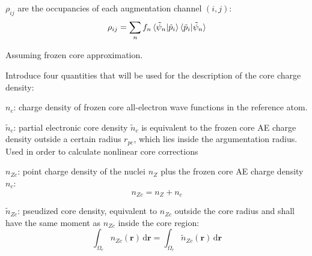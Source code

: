 \documentclass[english,10pt,aspectratio=169,fleqn]{beamer}
\begin{document}
\begin{frame} %

$\rho_{ij}$ are the  occupancies of each augmentation channel $(i,j)$:
\begin{equation*}
\rho_{ij} = \sum_{n} f_{n} \braket{\tilde{\psi}_{n} | \tilde{p}_{i} }
\braket{\tilde{p}_{i} | \tilde{\psi}_{n} }
\end{equation*}

\end{frame}



\begin{frame}

Assuming frozen core approximation.

Introduce four quantities that will be used for the description of the core
charge density:

$n_{c}$: charge density of frozen core all-electron wave functions
in the reference atom.

$\tilde{n}_{c}$: partial electronic core density $\tilde{n}_{c}$ is equivalent
to the frozen core AE charge density outside a certain radius $r_{pc}$, which lies
inside the argumentation radius. Used in order to calculate nonlinear core
corrections

$n_{Zc}$: point charge density of the nuclei $n_{Z}$ plus the frozen core AE charge
density $n_{c}$:
\begin{equation*}
n_{Zc} = n_{Z} + n_{c}
\end{equation*}

$\tilde{n}_{Zc}$: pseudized core density, equivalent to $n_{Zc}$ outside the core radius
and shall have the same moment as $n_{Zc}$ inside the core region:
\begin{equation*}
\int_{\Omega_{r}} n_{Zc}(\mathbf{r}) \, \mathrm{d}\mathbf{r} =
\int_{\Omega_{r}} \tilde{n}_{Zc}(\mathbf{r}) \, \mathrm{d}\mathbf{r}
\end{equation*}

\end{frame}
\end{document}
